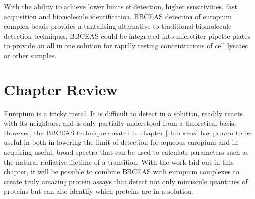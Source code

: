 With the ability to achieve lower limits of detection, higher sensitivities,
fast acquisition and biomolecule identification, \ac{BBCEAS} detection of
europium complex beads provides a tantalising alternative to traditional
biomolecule detection techniques. \ac{BBCEAS} could be integrated into
microtiter pipette plates to provide an all in one solution for rapidly
testing concentrations of cell lysates or other samples.



\section*{Chapter Review}

Europium is a tricky metal. It is difficult to detect in a solution, readily
reacts with its neighbors, and is only partially understood from a theoretical
basis. However, the \ac{BBCEAS} technique created in chapter \ref{ch:bbceas}
has proven to be useful in both in lowering the limit of detection for aqueous
europium and in acquiring useful, broad spectra that can be used to calculate
parameters such as the natural radiative lifetime of a transition. With the
work laid out in this chapter, it will be possible to combine \ac{BBCEAS} with
europium complexes to create truly amazing protein assays that detect not only
minuscule quantities of proteins but can also identify which proteins are in a
solution.

